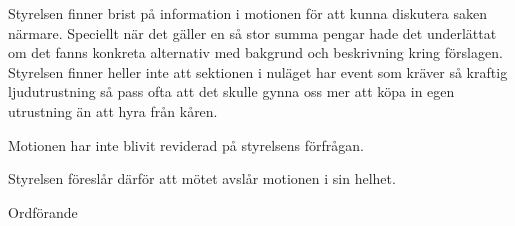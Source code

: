 \documentclass[../_main/handlingar.tex]{subfiles}
\begin{document}
\motionssvar
Styrelsen finner brist på information i motionen för att kunna diskutera saken närmare. Speciellt när det gäller en så stor summa pengar hade det underlättat om det fanns konkreta alternativ
med bakgrund och beskrivning kring förslagen. Styrelsen finner heller inte att sektionen i nuläget har event som kräver så kraftig ljudutrustning så pass ofta att det skulle 
gynna oss mer att köpa in egen utrustning än att hyra från kåren.

Motionen har inte blivit reviderad på styrelsens förfrågan.

Styrelsen föreslår därför att mötet avslår motionen i sin helhet.

\begin{signatures}{1}
    \ist
    \signature{\ordf}{Ordförande}
\end{signatures}
\end{document}
